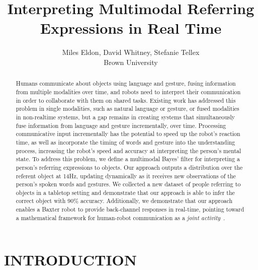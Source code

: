 \documentclass[letterpaper, 10 pt, conference]{ieeeconf}
\title{\LARGE \bf
Interpreting Multimodal Referring Expressions in Real Time}
\author{Miles Eldon, David Whitney, Stefanie Tellex\\Brown University}
\begin{document}
\maketitle
\thispagestyle{empty}
\pagestyle{empty}

\begin{abstract}
Humans communicate about objects using language and gesture, fusing
information from multiple modalities over time, and robots need to
interpret their communication in order to collaborate with them on
shared tasks.  Existing work has addressed this problem in single
modalities, such as natural language or gesture, or fused modalities
in non-realtime systems, but a gap remains in creating systems that
simultaneously fuse information from language and gesture
incrementally, over time. Processing communicative input incrementally
has the potential to speed up the robot's reaction time, as well as
incorporate the timing of words and gesture into the understanding
process, increasing the robot's speed and accuracy at interpreting the
person's mental state.  To address this problem, we define a
multimodal Bayes' filter for interpreting a person's referring
expressions to objects.  Our approach outputs a distribution over the
referent object at 14Hz, updating dynamically as it receives new
observations of the person's spoken words and gestures.  We collected
a new dataset of people referring to objects in a tabletop setting and
demonstrate that our approach is able to infer the correct object with
90\% accuracy.  Additionally, we demonstrate that our approach enables
a Baxter robot to provide back-channel responses in real-time,
pointing toward a mathematical framework for human-robot communication
as a {\em joint activity}~\citep{clark96}.
\end{abstract}


\section{INTRODUCTION}
\end{document}
